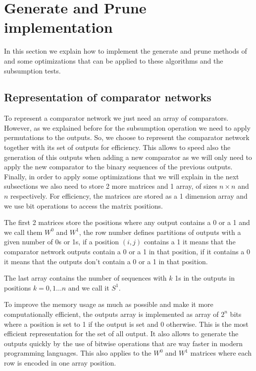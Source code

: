 \documentclass[../main.tex]{subfiles}
\begin{document}
	\section{Generate and Prune implementation}
	In this section we explain how to implement the generate and prune methods of \cite{sortingnineinputs} and some optimizations that can be applied to these algorithms and the subsumption tests. 
	
	\subsection{Representation of comparator networks}
	To represent a comparator network we just need an array of comparators. However, as we explained before for the subsumption operation we need to apply permutations to the outputs. So, we choose to represent the comparator network together with its set of outputs for efficiency. This allows to speed also the generation of this outputs when adding a new comparator as we will only need to apply the new comparator to the binary sequences of the previous outputs. Finally, in order to apply some optimizations that we will explain in the next subsections we also need to store 2 more matrices and 1 array, of sizes $n \times n$ and $n$ respectively. For efficiency, the matrices are stored as a 1 dimension array and we use bit operations to access the matrix positions. 
	
	The first 2 matrices store the positions where any output contains a 0 or a 1 and we call them $W^0$ and $W^1$, the row number defines partitions of outputs with a given number of 0s or 1s, if a position $(i,j)$ contains a 1 it means that the comparator network outputs contain a 0 or a 1 in that position, if it contains a 0 it means that the outputs don't contain a 0 or a 1 in that position. 
	
	The last array contains the number of sequences with $k$ 1s in the outputs in positions $k=0,1...n$ and we call it $S^{1}$.

	To improve the memory usage as much as possible and make it more computationally efficient, the outputs array is implemented as array of $2^n$ bits where a position is set to 1 if the output is set and 0 otherwise. This is the most efficient representation for the set of all output. It also allows to generate the outputs quickly by the use of bitwise operations that are way faster in modern programming languages. This also applies to the $W^0$ and $W^1$ matrices where each row is encoded in one array position.
	
\end{document}
